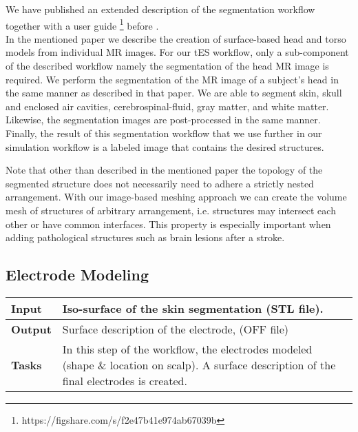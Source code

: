 We have published an extended description of the segmentation workflow together with a user guide
\footnote{https://figshare.com/s/f2e47b41e974ab67039b} before \cite{kalloch2018semi}.\\
In the mentioned paper we describe the creation of surface-based head and torso models from individual 
MR images. For our tES workflow, only a sub-component of the described workflow namely the segmentation
of the head MR image is required. We perform the segmentation of the MR image of a
subject's head  in the same manner as described in that paper. We are able to segment skin, skull
and enclosed air cavities, cerebrospinal-fluid, gray matter, and white matter. Likewise, the segmentation
images are post-processed in the same manner. Finally, the result of this segmentation workflow that
we use further in our simulation workflow is a labeled image that contains the desired structures.\par
Note that other than described in the mentioned paper the topology of the segmented structure does not 
necessarily need to adhere a strictly nested arrangement. With our image-based meshing approach we
can create the volume mesh of structures of arbitrary arrangement, i.e. structures may intersect each
other or have common interfaces. This property is especially important when adding pathological
structures such as brain lesions after a stroke.


\subsection{Electrode Modeling}\label{sec:electrodemodeling}
\begin{tabular}{ | p{} || p{} | }
    \hline
    \textbf{Input}  & Iso-surface of the skin segmentation (STL file).\\
    \hline
    \textbf{Output} & Surface description of the electrode, (OFF file) \\ 
    \hline
    \textbf{Tasks} & In this step of the workflow, the electrodes modeled (shape \& location on scalp).
                     A surface description of the final electrodes is created.\\
    \hline
\end{tabular}

\hspace{0.5cm}

